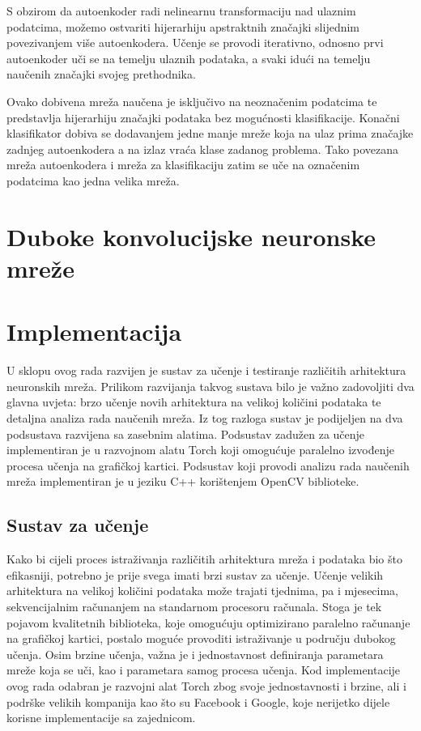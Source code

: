 \documentclass[lmodern, utf8, diplomski, numeric]{fer}
\begin{document}
S obzirom da autoenkoder radi nelinearnu transformaciju nad ulaznim podatcima, možemo ostvariti hijerarhiju apstraktnih značajki slijednim povezivanjem više autoenkodera. Učenje se provodi iterativno, odnosno prvi autoenkoder uči se na temelju ulaznih podataka, a svaki idući na temelju naučenih značajki svojeg prethodnika. 

Ovako dobivena mreža naučena je isključivo na neoznačenim podatcima te predstavlja hijerarhiju značajki podataka bez mogućnosti klasifikacije. Konačni klasifikator dobiva se dodavanjem jedne manje mreže koja na ulaz prima značajke zadnjeg autoenkodera a na izlaz vraća klase zadanog problema. Tako povezana mreža autoenkodera i mreža za klasifikaciju zatim se uče na označenim podatcima kao jedna velika mreža.





\chapter{Duboke konvolucijske neuronske mreže}

\chapter{Implementacija}

U sklopu ovog rada razvijen je sustav za učenje i testiranje različitih arhitektura neuronskih mreža. Prilikom razvijanja takvog sustava bilo je važno zadovoljiti dva glavna uvjeta: brzo učenje novih arhitektura na velikoj količini podataka te detaljna analiza rada naučenih mreža. Iz tog razloga sustav je podijeljen na dva podsustava razvijena sa zasebnim alatima. Podsustav zadužen za učenje implementiran je u razvojnom alatu Torch koji omogućuje paralelno izvođenje procesa učenja na grafičkoj kartici. Podsustav koji provodi analizu rada naučenih mreža implementiran je u jeziku C++ korištenjem OpenCV biblioteke.

\section{Sustav za učenje}

Kako bi cijeli proces istraživanja različitih arhitektura mreža i podataka bio što efikasniji, potrebno je prije svega imati brzi sustav za učenje. Učenje velikih arhitektura na velikoj količini podataka može trajati tjednima, pa i mjesecima, sekvencijalnim računanjem na standarnom procesoru računala. Stoga je tek pojavom kvalitetnih biblioteka, koje omogućuju optimizirano paralelno računanje na grafičkoj kartici, postalo moguće provoditi istraživanje u području dubokog učenja. 
Osim brzine učenja, važna je i jednostavnost definiranja parametara mreže koja se uči, kao i parametara samog procesa učenja. Kod implementacije ovog rada odabran je razvojni alat Torch zbog svoje jednostavnosti i brzine, ali i podrške velikih kompanija kao što su Facebook i Google, koje nerijetko dijele korisne implementacije sa zajednicom. 
\end{document}
